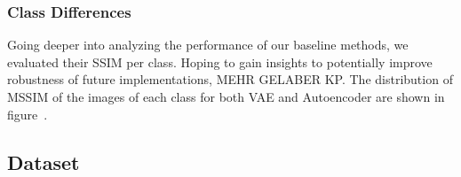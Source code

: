     \subsubsection{Class Differences}\label{subsubsec:class-differences}
        Going deeper into analyzing the performance of our baseline methods, we evaluated their SSIM per class.
        Hoping to gain insights to potentially improve robustness of future implementations, MEHR GELABER KP.
        The distribution of MSSIM of the images of each class for both VAE and Autoencoder are shown in figure~\cite{citationNeeded}.
        


\subsection{Dataset}\label{subsec:dataset}

